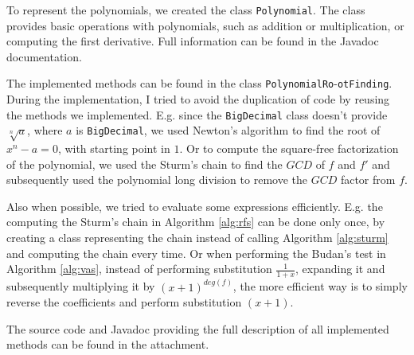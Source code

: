 \documentclass[
  digital, %
  notable,   %
  nolof,     %
  nolot,     %
	final, %
]{fithesis3}
\begin{document}
To represent the polynomials, we created the class \texttt{Polynomial}. The class provides basic operations with polynomials, such as addition or multiplication, or computing the first derivative. Full information can be found in the Javadoc documentation.

The implemented methods can be found in the class \texttt{PolynomialRo}-\texttt{otFinding}. During the implementation, I tried to avoid the duplication of code by reusing the methods we implemented. E.g. since the \texttt{BigDecimal} class doesn't provide $\sqrt[n]{a}$, where $a$ is \texttt{BigDecimal}, we used Newton's algorithm to find the root of $x^{n}-a=0$, with starting point in $1$. Or to compute the square-free factorization of the polynomial, we used the Sturm's chain to find the $GCD$ of $f$ and $f'$ and subsequently used the polynomial long division to remove the $GCD$ factor from $f$.

Also when possible, we tried to evaluate some expressions efficiently. E.g. the computing the Sturm's chain in Algorithm \ref{alg:rfs} can be done only once, by creating a class representing the chain instead of calling Algorithm \ref{alg:sturm} and computing the chain every time. Or when performing the Budan's test in Algorithm \ref{alg:vas}, instead of performing substitution $\frac{1}{1+x}$, expanding it and subsequently multiplying it by $(x+1)^{deg(f)}$, the more efficient way is to simply reverse the coefficients and perform substitution $(x+1)$.

The source code and Javadoc providing the full description of all implemented methods can be found in the attachment.

%		
\end{document}

